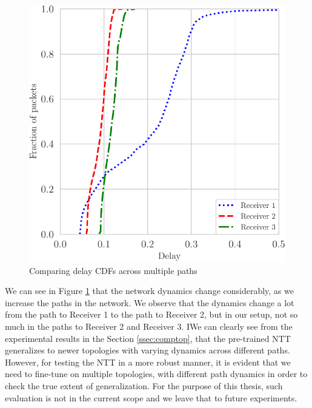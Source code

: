 \begin{figure}[!h]
  \begin{center}
    \includegraphics[scale=0.8]{figures/delay_Receivers.pdf}
    \caption{Comparing delay CDFs across multiple paths}
    \label{fig:multipatht}
  \end{center}
\end{figure}

We can see in Figure \ref{fig:multipatht} that the network dynamics change considerably, as we increase the paths in the network. We observe that the dynamics change a lot from the path to Receiver 1 to the path to Receiver 2, but in our setup, not so much in the paths to Receiver 2 and Receiver 3. IWe can clearly see from the experimental results in the Section \ref{ssec:comptop}, that the pre-trained NTT generalizes to newer topologies with varying dynamics across different paths. However, for testing the NTT in a more robust manner, it is evident that we need to fine-tune on multiple topologies, with different path dynamics in order to check the true extent of generalization. For the purpose of this thesis, such evaluation is not in the current scope and we leave that to future experiments.


